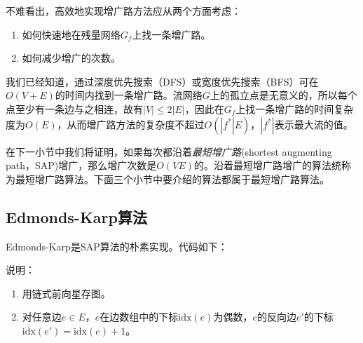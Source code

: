 \documentclass[a4paper]{ctexbook}
\newcommand{\idx}{\mathrm{idx}}
\begin{document}
  不难看出，高效地实现增广路方法应从两个方面考虑：
  \begin{enumerate}
    \item 如何快速地在残量网络$G_f$上找一条增广路。\label{Approach:1}
    \item 如何减少增广的次数。\label{Approach:2}
  \end{enumerate}

  我们已经知道，通过深度优先搜索（DFS）或宽度优先搜索（BFS）可在$O(V+E)$的时间内找到一条增广路。流网络$G$上的孤立点是无意义的，所以每个点至少有一条边与之相连，故有$|V|\le 2|E|$，因此在$G_f$上找一条增广路的时间复杂度为$O(E)$，从而增广路方法的复杂度不超过$O(|f^*|E)$，$|f^*|$表示最大流的值。

  在下一小节中我们将证明，如果每次都沿着\emph{最短增广路}(shortest augmenting path，SAP)增广，那么增广次数是$O(VE)$的。沿着最短增广路增广的算法统称为最短增广路算法。下面三个小节中要介绍的算法都属于最短增广路算法。
  \subsection{Edmonds-Karp算法}
  Edmonds-Karp是SAP算法的朴素实现。代码如下：
  
  说明：
  \begin{enumerate}
    \item 用链式前向星存图。
    \item 对任意边$e \in E$，$e$在边数组中的下标$\idx(e)$为偶数，$e$的反向边$e'$的下标$\idx(e') = \idx(e) + 1$。
  \end{enumerate}
\end{document}
